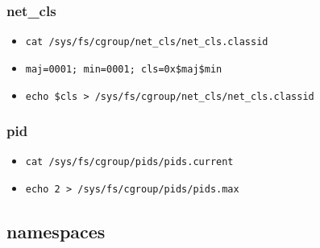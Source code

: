 \documentclass{beamer}
\begin{document}
\begin{frame}[fragile]
    \frametitle{net\_cls}
    \begin{itemize}
        \item \verb|cat /sys/fs/cgroup/net_cls/net_cls.classid|
        \item \verb|maj=0001; min=0001; cls=0x$maj$min|
        \item \verb|echo $cls > /sys/fs/cgroup/net_cls/net_cls.classid|
    \end{itemize}
\end{frame}

\begin{frame}[fragile]
    \frametitle{pid}
    \begin{itemize}
        \item \verb|cat /sys/fs/cgroup/pids/pids.current|
        \item \verb|echo 2 > /sys/fs/cgroup/pids/pids.max|
    \end{itemize}
\end{frame}

\subsection{namespaces}
\end{document}
